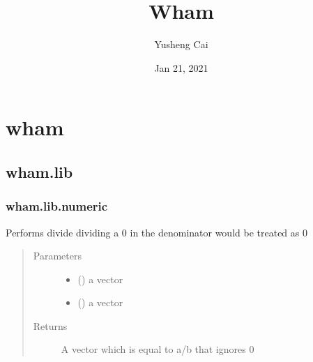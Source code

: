 \documentclass[letterpaper,10pt,english]{sphinxmanual}
\title{Wham}
\date{Jan 21, 2021}
\author{Yusheng Cai}
\begin{document}
\pagestyle{empty}
\sphinxmaketitle
\pagestyle{plain}
\sphinxtableofcontents
\pagestyle{normal}
\label{\detokenize{index::doc}}



\chapter{wham}
\label{\detokenize{wham:wham}}\label{\detokenize{wham::doc}}\label{\detokenize{wham::doc}}

\section{wham.lib}
\label{\detokenize{wham.lib:wham-lib}}\label{\detokenize{wham.lib::doc}}

\subsection{wham.lib.numeric}
\label{\detokenize{wham.lib:module-wham.lib.numeric}}\label{\detokenize{wham.lib:wham-lib-numeric}}

\begin{fulllineitems}
\label{\detokenize{wham.lib:wham.lib.numeric.safe_divide}}
Performs divide dividing a 0 in the denominator would be treated as 0
\begin{quote}\begin{description}
\item[{Parameters}] \leavevmode\begin{itemize}
\item {} 
 () \textendash{} a vector

\item {} 
 () \textendash{} a vector

\end{itemize}

\item[{Returns}] \leavevmode
A vector which is equal to a/b that ignores 0

\end{description}\end{quote}

\end{fulllineitems}
\end{document}
